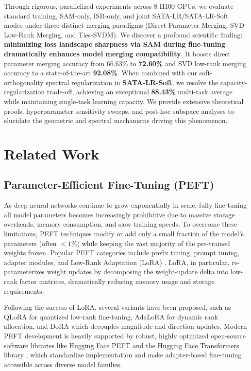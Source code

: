 \documentclass{article}
\begin{document}
Through rigorous, parallelized experiments across 8 H100 GPUs, we evaluate standard training, SAM-only, ISR-only, and joint SATA-LR/SATA-LR-Soft modes under three distinct merging paradigms (Direct Parameter Merging, SVD Low-Rank Merging, and Ties-SVDM). We discover a profound scientific finding: \textbf{minimizing loss landscape sharpness via SAM during fine-tuning dramatically enhances model merging compatibility}. It boosts direct parameter merging accuracy from 66.63\% to \textbf{72.60\%} and SVD low-rank merging accuracy to a state-of-the-art \textbf{92.08\%}. When combined with our soft-orthogonality spectral regularization in \textbf{SATA-LR-Soft}, we resolve the capacity-regularization trade-off, achieving an exceptional \textbf{88.43\%} multi-task average while maintaining single-task learning capacity. We provide extensive theoretical proofs, hyperparameter sensitivity sweeps, and post-hoc subspace analyses to elucidate the geometric and spectral mechanisms driving this phenomenon.

\section{Related Work}
\label{submission-related-work}

\subsection{Parameter-Efficient Fine-Tuning (PEFT)}
As deep neural networks continue to grow exponentially in scale, fully fine-tuning all model parameters becomes increasingly prohibitive due to massive storage overheads, memory consumption, and slow training speeds. To overcome these limitations, PEFT techniques \cite{lialin2023scaling} modify or add only a small fraction of the model's parameters (often $<1\%$) while keeping the vast majority of the pre-trained weights frozen. Popular PEFT categories include prefix tuning, prompt tuning, adapter modules, and Low-Rank Adaptation (LoRA) \cite{hu2021lora}. LoRA, in particular, re-parameterizes weight updates by decomposing the weight-update delta into low-rank factor matrices, dramatically reducing memory usage and storage requirements. 

Following the success of LoRA, several variants have been proposed, such as QLoRA \cite{dettmers2023qlora} for quantized low-rank fine-tuning, AdaLoRA \cite{zhang2023adalora} for dynamic rank allocation, and DoRA \cite{liu2024dora} which decouples magnitude and direction updates. Modern PEFT development is heavily supported by robust, highly optimized open-source software libraries like Hugging Face PEFT \cite{peft} and the Hugging Face Transformers library \cite{wolf2020transformers}, which standardize implementation and make adapter-based fine-tuning accessible across diverse model families.
\end{document}
